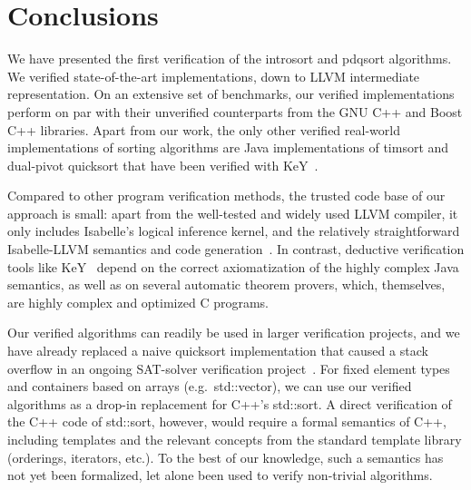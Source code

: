 \documentclass[runningheads]{llncs}
\begin{document}
{%


\section{Conclusions}
We have presented the first verification of the introsort and pdqsort algorithms.
We verified state-of-the-art implementations, down to LLVM intermediate representation.
On an extensive set of benchmarks, our verified implementations perform on par with their
unverified counterparts from the GNU C++ and Boost C++ libraries.
Apart from our work, the only other verified real-world implementations of sorting algorithms
are Java implementations of timsort and dual-pivot quicksort that have been verified with KeY~\cite{GRBBH15,BSSU17}.


Compared to other program verification methods, the trusted code base of our approach is small:
apart from the well-tested and widely used LLVM compiler, it only includes Isabelle's logical inference kernel, and the
relatively straightforward Isabelle-LLVM semantics and code generation~\cite{La19-llvm}.
In contrast, deductive verification tools like KeY~\cite{BHS07} depend on the correct axiomatization of the highly complex Java semantics,
as well as on several automatic theorem provers, which, themselves, are highly complex and optimized C programs.

Our verified algorithms can readily be used in
larger verification projects, and we have already replaced a naive quicksort implementation that caused a stack overflow in
an ongoing SAT-solver verification project~\cite{FBL18}.
For fixed element types and containers based on arrays (e.g.\ std::vector), we can use our verified algorithms as
a drop-in replacement for C++'s std::sort. A direct verification of the C++ code of std::sort, however,
would require a formal semantics of C++, including templates and the relevant concepts from the standard template library (orderings, iterators, etc.).
To the best of our knowledge, such a semantics has not yet been formalized, let alone been used to verify non-trivial algorithms.

}
\end{document}
